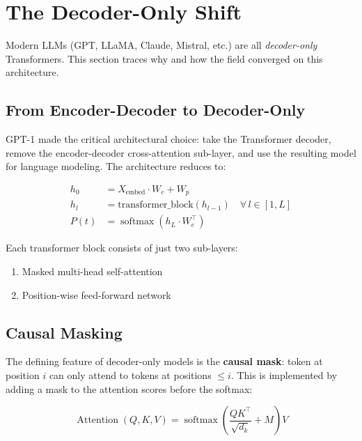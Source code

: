 \documentclass[11pt,a4paper]{article}
\newcommand{\softmax}{\operatorname{softmax}}
\newcommand{\Attention}{\operatorname{Attention}}
\newcommand{\dk}{d_k}
\begin{document}
\section{The Decoder-Only Shift}
\label{sec:decoder-only}

Modern LLMs (GPT, LLaMA, Claude, Mistral, etc.) are all \emph{decoder-only} Transformers.
This section traces why and how the field converged on this architecture.

\subsection{From Encoder-Decoder to Decoder-Only}

GPT-1 \cite{radford2018} made the critical architectural choice: take the Transformer
decoder, remove the encoder-decoder cross-attention sub-layer, and use the resulting model
for language modeling. The architecture reduces to:

\begin{align}
  h_0 &= X_{\text{embed}} \cdot W_e + W_p \\
  h_l &= \text{transformer\_block}(h_{l-1}) \quad \forall\, l \in [1, L] \\
  P(t) &= \softmax(h_L \cdot W_e^\top)
\end{align}

Each transformer block consists of just two sub-layers:
\begin{enumerate}[nosep]
  \item Masked multi-head self-attention
  \item Position-wise feed-forward network
\end{enumerate}

\subsection{Causal Masking}

The defining feature of decoder-only models is the \textbf{causal mask}: token at position
$i$ can only attend to tokens at positions $\leq i$. This is implemented by adding a mask
to the attention scores before the softmax:

\begin{equation}
  \Attention(Q, K, V) = \softmax\!\left(\frac{QK^\top}{\sqrt{\dk}} + M \right) V
\end{equation}
\end{document}
